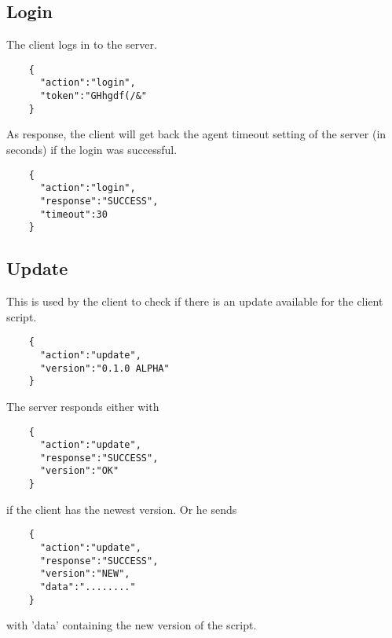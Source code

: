 \documentclass{article}
\begin{document}
	\subsection*{Login}
	The client logs in to the server.
	\begin{verbatim}
	{
	  "action":"login",
	  "token":"GHhgdf(/&"
	}
	\end{verbatim}
	As response, the client will get back the agent timeout setting of the server (in seconds) if the login
	was successful.
	\begin{verbatim}
	{
	  "action":"login",
	  "response":"SUCCESS",
	  "timeout":30
	}
	\end{verbatim}
	
	\subsection*{Update}
	This is used by the client to check if there is an update available for the client script.
	\begin{verbatim}
	{
	  "action":"update",
	  "version":"0.1.0 ALPHA"
	}
	\end{verbatim}
	The server responds either with
	\begin{verbatim}
	{
	  "action":"update",
	  "response":"SUCCESS",
	  "version":"OK"
	}
	\end{verbatim}
	if the client has the newest version. Or he sends
	\begin{verbatim}
	{
	  "action":"update",
	  "response":"SUCCESS",
	  "version":"NEW",
	  "data":"........"
	}
	\end{verbatim}
	with 'data' containing the new version of the script.
	
\end{document}
